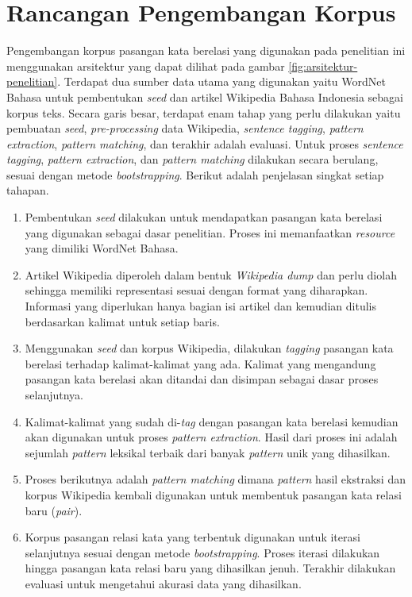\section{Rancangan Pengembangan Korpus}
Pengembangan korpus pasangan kata berelasi yang digunakan pada penelitian ini menggunakan arsitektur yang dapat dilihat pada gambar \ref{fig:arsitektur-penelitian}. Terdapat dua sumber data utama yang digunakan yaitu WordNet Bahasa untuk pembentukan \textit{seed} dan artikel Wikipedia Bahasa Indonesia sebagai korpus teks. Secara garis besar, terdapat enam tahap yang perlu dilakukan yaitu pembuatan \textit{seed}, \textit{pre-processing} data Wikipedia, \textit{sentence tagging}, \textit{pattern extraction}, \textit{pattern matching}, dan terakhir adalah evaluasi. Untuk proses \textit{sentence tagging}, \textit{pattern extraction}, dan \textit{pattern matching} dilakukan secara berulang, sesuai dengan metode \textit{bootstrapping}. Berikut adalah penjelasan singkat setiap tahapan.
\begin{enumerate}
  \item Pembentukan \textit{seed} dilakukan untuk mendapatkan pasangan kata berelasi yang digunakan sebagai dasar penelitian. Proses ini memanfaatkan \textit{resource} yang dimiliki WordNet Bahasa.
  \item Artikel Wikipedia diperoleh dalam bentuk \textit{Wikipedia dump} dan perlu diolah sehingga memiliki representasi sesuai dengan format yang diharapkan. Informasi yang diperlukan hanya bagian isi artikel dan kemudian ditulis berdasarkan kalimat untuk setiap baris.
  \item Menggunakan \textit{seed} dan korpus Wikipedia, dilakukan \textit{tagging} pasangan kata berelasi terhadap kalimat-kalimat yang ada. Kalimat yang mengandung pasangan kata berelasi akan ditandai dan disimpan sebagai dasar proses selanjutnya.
  \item Kalimat-kalimat yang sudah di-\textit{tag} dengan pasangan kata berelasi kemudian akan digunakan untuk proses \textit{pattern extraction}. Hasil dari proses ini adalah sejumlah \textit{pattern} leksikal terbaik dari banyak \textit{pattern} unik yang dihasilkan.
  \item Proses berikutnya adalah \textit{pattern matching} dimana \textit{pattern} hasil ekstraksi dan korpus Wikipedia kembali digunakan untuk membentuk pasangan kata relasi baru (\textit{pair}).
  \item Korpus pasangan relasi kata yang terbentuk digunakan untuk iterasi selanjutnya sesuai dengan metode \textit{bootstrapping}. Proses iterasi dilakukan hingga pasangan kata relasi baru yang dihasilkan jenuh. Terakhir dilakukan evaluasi untuk mengetahui akurasi data yang dihasilkan.
\end{enumerate}

